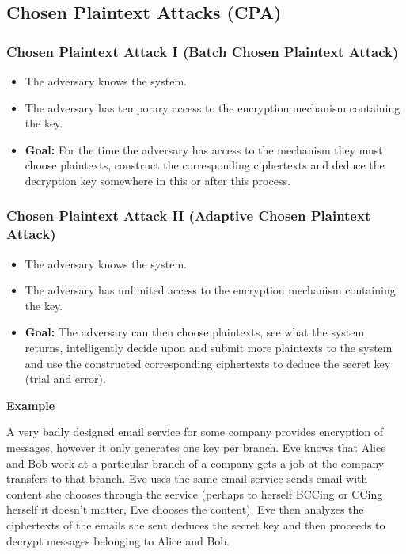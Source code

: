 


\subsection{Chosen Plaintext Attacks (CPA)}

\subsubsection*{Chosen Plaintext Attack I (Batch Chosen Plaintext Attack)}

\begin{itemize}
\item The adversary knows the system.
\item The adversary has temporary access to the encryption mechanism containing the key.
\item \textbf{Goal:} For the time the adversary has access to the mechanism they must choose plaintexts, construct the corresponding ciphertexts and deduce the decryption key somewhere in this or after this process.
\end{itemize}



\subsubsection*{Chosen Plaintext Attack II (Adaptive Chosen Plaintext Attack)}

\begin{itemize}
\item The adversary knows the system.
\item The adversary has unlimited access to the encryption mechanism containing the key.
\item \textbf{Goal:} The adversary can then choose plaintexts, see what the system returns, intelligently decide upon and submit more plaintexts to the system and use the constructed corresponding ciphertexts to deduce the secret key (trial and error).
\end{itemize}

\textbf{Example}


A very badly designed email service for some company provides encryption of messages, however it only generates one key per branch.
Eve knows that Alice and Bob work at a particular branch of a company gets a job at the company transfers to that branch. 
Eve uses the same email service sends email with content she chooses through the service (perhaps to herself BCCing or CCing herself it doesn’t matter, Eve chooses the content), Eve then analyzes the ciphertexts of the emails she sent deduces the secret key and then proceeds to decrypt messages belonging to Alice and Bob. 




